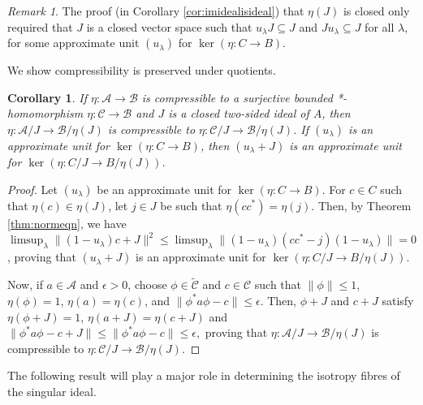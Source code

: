 \documentclass[a4paper, 12pt]{amsart}
\newtheorem{cor}[thm]{Corollary}
\theoremstyle{definition}
\theoremstyle{remark}
\newtheorem{rmk}[thm]{Remark}
\numberwithin{equation}{section}
\begin{document}
\begin{rmk}
    The proof (in Corollary \ref{cor:imidealisideal}) that $\eta(J)$ is closed only required that $J$ is a closed vector space such that $u_{\lambda} J\subseteq J$ and $Ju_{\lambda}\subseteq J$ for all $\lambda$, for some approximate unit $(u_{\lambda})$ for $\ker(\eta:C\to B)$.
\end{rmk}

We show compressibility is preserved under quotients.

\begin{cor}
\label{cor:comppasstoquotient}
    If $\eta:\mathcal{A}\to \mathcal{B}$ is compressible to a surjective bounded *-homomorphism $\eta:\mathcal{C}\to \mathcal{B}$ and $J$ is a closed two-sided ideal of $A$, then $\eta:\mathcal{A}/J\to \mathcal{B}/\eta(J)$ is compressible to $\eta:\mathcal{C}/J\to \mathcal{B}/\eta(J)$. If $(u_{\lambda})$ is an approximate unit for $\ker(\eta:C\to B)$, then  $(u_{\lambda} + J)$ is an approximate unit for $\ker(\eta: C/J\to B/\eta(J))$.
\end{cor}

\begin{proof}
    Let $(u_{\lambda})$ be an approximate unit for $\ker(\eta:C\to B)$. For $c\in C$ such that $\eta(c)\in \eta(J)$, let $j\in J$ be such that $\eta(cc^{*}) = \eta(j)$. Then, by Theorem \ref{thm:normeqn}, we have $\limsup_{\lambda}\| (1 - u_{\lambda})c + J\|^{2}\leq  \limsup_{\lambda}\|(1-u_{\lambda})(cc^{*} - j)(1-u_{\lambda})\| = 0$, proving that $(u_{\lambda} + J)$ is an approximate unit for $\ker(\eta: C/J\to B/\eta(J))$.

    Now, if $a\in\mathcal{A}$ and $\epsilon > 0$, choose $\phi\in\widetilde{\mathcal{C}}$ and  $c\in\mathcal{C}$ such that $\|\phi\|\leq 1$, $\eta(\phi) = 1$, $\eta(a) = \eta(c)$, and $\|\phi^{*} a\phi  - c\|\leq \epsilon$. Then, $\phi + J$ and $c + J$ satisfy $\eta(\phi + J) = 1$, $\eta(a + J) = \eta (c + J)$ and $\|\phi^{*}a\phi - c + J\|\leq \|\phi^{*} a\phi  - c\|\leq \epsilon,$ proving that $\eta:\mathcal{A}/J\to \mathcal{B}/\eta(J)$ is compressible to $\eta:\mathcal{C}/J\to \mathcal{B}/\eta(J)$.
\end{proof}


The following result will play a major role in determining the isotropy fibres of the singular ideal.
\end{document}
